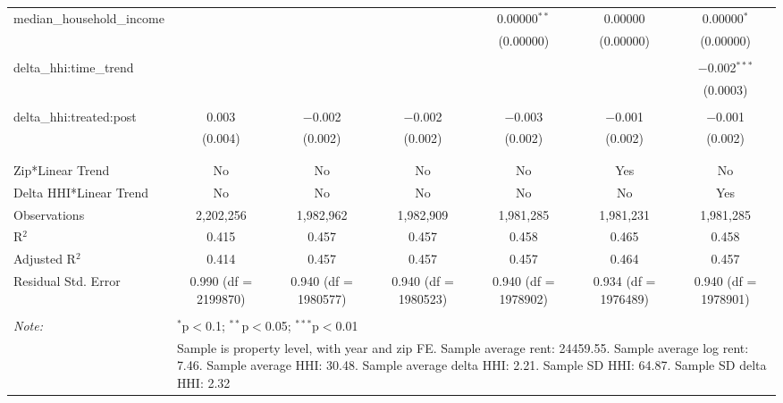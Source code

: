 \begin{table}[H]
{\begin{tabular}{@{\extracolsep{5pt}}lcccccc}
  median\_household\_income &  &  &  & 0.00000$^{**}$ & 0.00000 & 0.00000$^{*}$ \\  

   &  &  &  & (0.00000) & (0.00000) & (0.00000) \\  

   & & & & & & \\  

  delta\_hhi:time\_trend &  &  &  &  &  & $-$0.002$^{***}$ \\  

   &  &  &  &  &  & (0.0003) \\  

   & & & & & & \\  

  delta\_hhi:treated:post & 0.003 & $-$0.002 & $-$0.002 & $-$0.003 & $-$0.001 & $-$0.001 \\  

   & (0.004) & (0.002) & (0.002) & (0.002) & (0.002) & (0.002) \\  

   & & & & & & \\  

 \hline \\[-1.8ex]  

 Zip*Linear Trend & No & No & No & No & Yes & No \\  

 Delta HHI*Linear Trend & No & No & No & No & No & Yes \\  

 Observations & 2,202,256 & 1,982,962 & 1,982,909 & 1,981,285 & 1,981,231 & 1,981,285 \\  

 R$^{2}$ & 0.415 & 0.457 & 0.457 & 0.458 & 0.465 & 0.458 \\  

 Adjusted R$^{2}$ & 0.414 & 0.457 & 0.457 & 0.457 & 0.464 & 0.457 \\  

 Residual Std. Error & 0.990 (df = 2199870) & 0.940 (df = 1980577) & 0.940 (df = 1980523) & 0.940 (df = 1978902) & 0.934 (df = 1976489) & 0.940 (df = 1978901) \\  

 \hline  

 \hline \\[-1.8ex]  

 \textit{Note:}  & \multicolumn{6}{l}{$^{*}$p$<$0.1; $^{**}$p$<$0.05; $^{***}$p$<$0.01} \\  

  & \multicolumn{6}{l}{Sample is property level, with year and zip FE. Sample average rent: 24459.55. Sample average log rent: 7.46. Sample average HHI: 30.48. Sample average delta HHI: 2.21. Sample SD HHI: 64.87. Sample SD delta HHI: 2.32} \\  

 \end{tabular}}  

 \end{table}  

